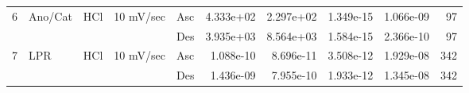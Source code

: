 \begin{tabular}{lllllrrrrr}
6 & Ano/Cat & HCl & 10 mV/sec & Asc &        4.333e+02 &           2.297e+02 &             1.349e-15 &                       1.066e-09 &   97 \\
  &     &     &           & Des &        3.935e+03 &           8.564e+03 &             1.584e-15 &                       2.366e-10 &   97 \\
7 & LPR & HCl & 10 mV/sec & Asc &        1.088e-10 &           8.696e-11 &             3.508e-12 &                       1.929e-08 &  342 \\
  &     &     &           & Des &        1.436e-09 &           7.955e-10 &             1.933e-12 &                       1.345e-08 &  342 \\
\bottomrule
\end{tabular}
